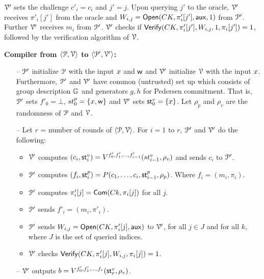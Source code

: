 $\mathcal{V}'$ sets the challenge $c'_i = c_i$ and $j' = j$. Upon querying $j'$ to the oracle, $\mathcal{V}'$ receives $\pi'_i[j']$ from the oracle and $W_{i,j} = \mathsf{Open}(CK, \pi'_i[j'], \mathsf{aux}, 1)$ from $\mathcal{P}'$. Further $\mathcal{V}'$ receives $m_i$ from $\mathcal{P}'$. $\mathcal{V}'$ checks if $\mathsf{Verify}(CK, \pi'_i[j'], W_{i,j}, 1, \pi_i[j']) = 1$, followed by the verification algorithm of $\mathcal{V}$.

\textbf{Compiler from $\langle \mathcal{P},\mathcal{V}\rangle$ to $\langle \mathcal{P}',\mathcal{V}'\rangle$:}
\begin{itemize}
	\item[--] $\mathcal{P}'$ initialize $\mathcal{P}$ with the input ${x}$ and $\mathsf{w}$ and $\mathcal{V}'$ initialize $\mathcal{V}$ with the input ${x}$. Furthermore, $\mathcal{P}'$ and $\mathcal{V}'$ have common (untrusted) set up which consists of group description $\mathbb{G}$ and generators $g, h$ for Pedersen commitment. That is, $\mathcal{P}'$ sets $f'_0 = \bot$, $st^p_0 = \{{x}, \mathsf{w}\}$ and $\mathcal{V}'$ sets $\mathsf{st}^v_0 = \{{x}\}$. Let $\rho_p$ and $\rho_v$ are the randomness of $\mathcal{P}$ and $\mathcal{V}$.
	
	\item[--] Let $r$ = number of rounds of $\langle \mathcal{P},\mathcal{V}\rangle$.
	For $i = 1$ to $r$, $\mathcal{P}'$ and $\mathcal{V}'$ do the following: 
	\begin{itemize}
		\item $\mathcal{V}'$ computes $(c_i,\mathsf{st}^v_i) = V^{f'_0, f'_1, \ldots, f'_{i-1}}(st^v_{i-1}, \rho_v)$ and sends $c_i$ to $\mathcal{P}'$.
		\item $\mathcal{P}'$ computes $(f_i,\mathsf{st}^p_i) = P(c_1, \ldots, c_{i}, \mathsf{st}^p_{i-1}, \rho_p)$. Where $f_i = (m_i, \pi_i)$.
		\item $\mathcal{P}'$ computes $\pi'_i[j] = \mathsf{Com}(Ck, \pi_i[j])$ for all $j$. %
		\item $\mathcal{P}'$ sends $f'_i = (m_i, \pi'_i)$.
		\item $\mathcal{P}'$ sends $W_{i,j} = \mathsf{Open}(CK, \pi'_i[j], \mathsf{aux})$ to $\mathcal{V}'$, for all $j\in J$ and for all $k$, where $J$ is the set of queried indices.
		\item $\mathcal{V}'$ checks $\mathsf{Verify}(CK, \pi'_i[j], W_{i,j}, \pi_i[j]) = 1$.
	\end{itemize} 
	\item[--] $\mathcal{V}'$ outputs $b = V^{f'_0, f'_1, \ldots, f_r} ( \mathsf{st}^v_r , \rho_v)$.
\end{itemize}


